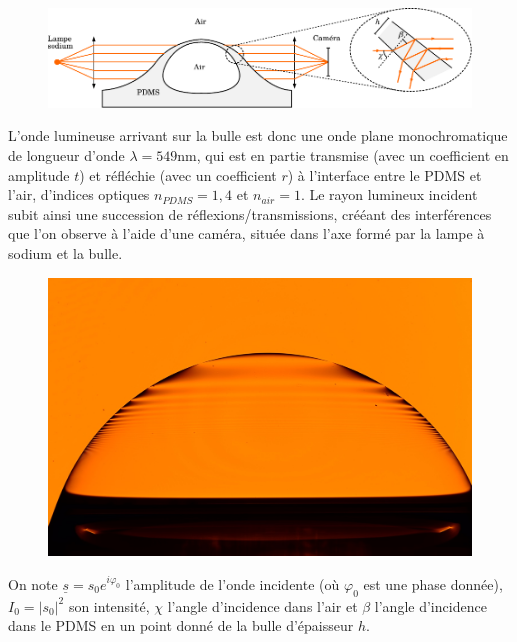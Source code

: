 \documentclass{report}
\begin{document}
\begin{figure}[h]
\centering
  \includegraphics[scale=1.1]{optique_bulle.pdf}
\end{figure}

L'onde lumineuse arrivant sur la bulle est donc une onde plane monochromatique de longueur d'onde $\lambda=549$nm, qui est en partie transmise (avec un coefficient en amplitude $t$) et réfléchie (avec un coefficient $r$) à l'interface entre le PDMS et l'air, d'indices optiques $n_{PDMS}=1,4$ et $n_{air}=1$. Le rayon lumineux incident subit ainsi une succession de réflexions/transmissions, crééant des interférences que l'on observe à l'aide d'une caméra, située dans l'axe formé par la lampe à sodium et la bulle. 

\begin{figure}[h]
\centering
  \includegraphics[scale=0.15]{bulle3.jpg}
\end{figure}

On note $\underline{s}=s_0e^{i\varphi_0}$ l'amplitude de l'onde incidente (où $\varphi_0$ est une phase donnée), $I_0=|s_0|^2$ son intensité, $\chi$ l'angle d'incidence dans l'air et $\beta$ l'angle d'incidence dans le PDMS en un point donné de la bulle d'épaisseur $h$.
\end{document}
